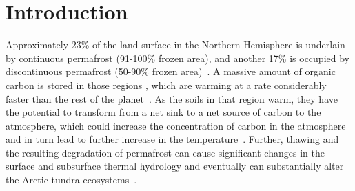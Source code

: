 \documentclass[review]{elsarticle}
\begin{document}
\linenumbers

\section{Introduction}

Approximately 23\% of the land surface in the Northern Hemisphere is underlain by continuous permafrost (91-100\% frozen area), and another 17\% is occupied by discontinuous permafrost (50-90\% frozen area)~\cite{brown1997circum,jorgenson2001permafrost}. A massive amount of organic carbon is stored in those regions \cite{tarnocai2009soil}, which are warming at a rate considerably faster than the rest of the planet~\cite{turner2007arctic, hansen1999giss, assessment2004impacts}.  As the soils in that region warm, they have the potential to transform from a net sink to a net source of carbon to the atmosphere, which could increase the concentration of carbon in the atmosphere and in turn lead to further increase in the temperature~\cite{billings1982arctic}. Further, thawing and the resulting degradation of permafrost can cause significant changes in the surface and subsurface thermal hydrology and eventually can substantially alter the Arctic tundra ecosystems~\cite{osterkamp1983response, walvoord2007increased, lyon2009estimation, pachauri2014climate,koven2013analysis}. 
\end{document}
